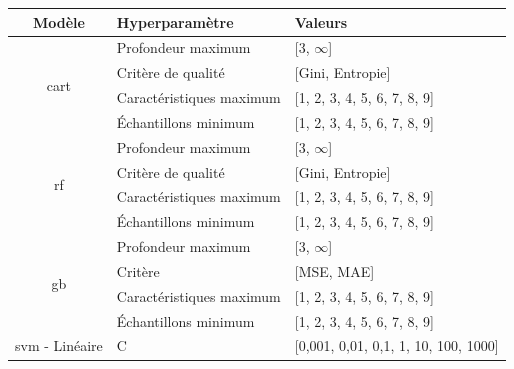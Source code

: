 \begin{table}[H]
    \centering
    \begin{tabular}{cll}
        \toprule
        \textbf{Modèle}                                 & \textbf{Hyperparamètre}   & \textbf{Valeurs}                          \\ \midrule
        \multirow{4}{*}{\gls{cart}}                     & Profondeur maximum        & [3, $\infty$]                             \\ \cmidrule{2-3} 
                                                        & Critère de qualité        & [Gini, Entropie]                          \\ \cmidrule{2-3}   
                                                        & Caractéristiques maximum  & [1, 2, 3, 4, 5, 6, 7, 8, 9]               \\ \cmidrule{2-3}   
                                                        & Échantillons minimum      & [1, 2, 3, 4, 5, 6, 7, 8, 9]               \\ \midrule 
        \multirow{4}{*}{\gls{rf}}                       & Profondeur maximum        & [3, $\infty$]                             \\ \cmidrule{2-3} 
                                                        & Critère de qualité        & [Gini, Entropie]                          \\ \cmidrule{2-3}   
                                                        & Caractéristiques maximum  & [1, 2, 3, 4, 5, 6, 7, 8, 9]               \\ \cmidrule{2-3}   
                                                        & Échantillons minimum      & [1, 2, 3, 4, 5, 6, 7, 8, 9]               \\ \midrule 
        \multirow{4}{*}{\gls{gb}}                       & Profondeur maximum        & [3, $\infty$]                             \\ \cmidrule{2-3}
                                                        & Critère                   & [MSE, MAE]                                \\ \cmidrule{2-3} 
                                                        & Caractéristiques maximum  & [1, 2, 3, 4, 5, 6, 7, 8, 9]               \\ \cmidrule{2-3}   
                                                        & Échantillons minimum      & [1, 2, 3, 4, 5, 6, 7, 8, 9]               \\ \midrule 
        \gls{svm} - Linéaire                            & C                         & [0,001, 0,01, 0,1, 1, 10, 100, 1000]      \\ \midrule

\end{tabular}
\end{table}
